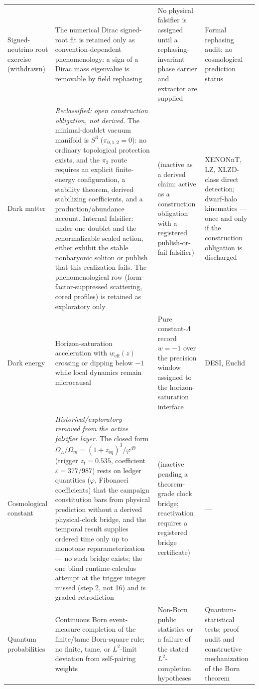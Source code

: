 \documentclass[11pt]{article}
\theoremstyle{plain}
\theoremstyle{definition}
\theoremstyle{remark}
\begin{document}
{\begin{longtable}{@{}>{\raggedright\arraybackslash}p{}>{\raggedright\arraybackslash}p{}>{\raggedright\arraybackslash}p{}>{\raggedright\arraybackslash}p{}@{}}
Signed-neutrino root exercise (withdrawn) & The numerical Dirac signed-root fit is retained only as convention-dependent phenomenology: a sign of a Dirac mass eigenvalue is removable by field rephasing & No physical falsifier is assigned until a rephasing-invariant phase carrier and extractor are supplied & Formal rephasing audit; no cosmological prediction status \\
Dark matter & \emph{Reclassified: open construction obligation, not derived.} The minimal-doublet vacuum manifold is \(S^3\) (\(\pi_{0,1,2}=0\)): no ordinary topological protection exists, and the \(\pi_3\) route requires an explicit finite-energy configuration, a stability theorem, derived stabilizing coefficients, and a production/abundance account. Internal falsifier: under one doublet and the renormalizable sealed action, either exhibit the stable nonbaryonic soliton or publish that this realization fails. The phenomenological row (form-factor-suppressed scattering, cored profiles) is retained as exploratory only & (inactive as a derived claim; active as a construction obligation with a registered publish-or-fail falsifier) & XENONnT, LZ, XLZD-class direct detection; dwarf-halo kinematics --- once and only if the construction obligation is discharged \\
Dark energy & Horizon-saturation acceleration with \(w_{\mathrm{eff}}(z)\) crossing or dipping below \(-1\) while local dynamics remain microcausal & Pure constant-\(\Lambda\) record \(w=-1\) over the precision window assigned to the horizon-saturation interface & DESI, Euclid \\
Cosmological constant & \emph{Historical/exploratory --- removed from the active falsifier layer.} The closed form \(\Omega_\Lambda/\Omega_m = (1+z_{\mathrm{eq}})^3/\varphi^{49}\) (trigger \(z_t = 0.535\), coefficient \(\varepsilon = 377/987\)) rests on ledger quantities (\(\varphi\), Fibonacci coefficients) that the campaign constitution bars from physical prediction without a derived physical-clock bridge, and the temporal result supplies ordered time only up to monotone reparameterization --- no such bridge exists; the one blind runtime-calculus attempt at the trigger integer missed (step 2, not 16) and is graded retrodiction & (inactive pending a theorem-grade clock bridge; reactivation requires a registered bridge certificate) & --- \\
Quantum probabilities & Continuous Born event-measure completion of the finite/tame Born-square rule; no finite, tame, or \(L^2\)-limit deviation from self-pairing weights & Non-Born public statistics or a failure of the stated \(L^2\)-completion hypotheses & Quantum-statistical tests; proof audit and constructive mechanization of the Born theorem \\

\end{longtable}}
\end{document}
